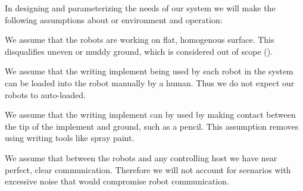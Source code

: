 
In designing and parameterizing the needs of our system we will make the following assumptions about or environment and operation: 
\begin{list}{A:~}{}
\item We assume that the robots are working on flat, homogenous surface. This disqualifies uneven or muddy ground, which is considered out of scope ().
\item We assume that the writing implement being used by each robot in the system can be loaded into the robot manually by a human. Thus we do not expect our robots to auto-loaded. 
\item We assume that the writing implement can by used by making contact between the tip of the implement and ground, such as a pencil. This assumption removes using writing tools like spray paint.
\item We assume that between the robots and any controlling host we have near perfect, clear communication. Therefore we will not account for scenarios with excessive noise that would compromise robot communication.  
\end{list}

